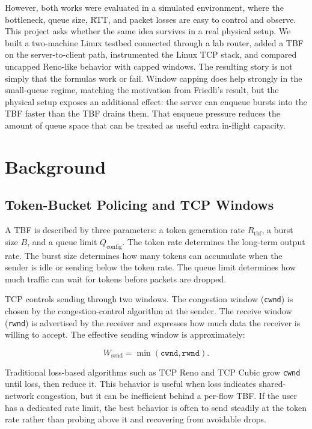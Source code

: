 \documentclass{article}
\newcommand{\code}[1]{\texttt{#1}}
\begin{document}
However, both works were evaluated in a simulated environment, where the bottleneck, queue size, RTT, and packet losses are easy 
to control and observe. This project asks whether the same idea survives in a real physical setup. We built a two-machine 
Linux testbed connected through a lab router, added a TBF on the server-to-client path, instrumented the Linux TCP stack, 
and compared uncapped Reno-like behavior with capped windows. The resulting story is not simply that the formulas work 
or fail. Window capping does help strongly in the small-queue regime, matching the motivation from Friedli's result, but 
the physical setup exposes an additional effect: the server can enqueue bursts into the TBF faster than the TBF drains 
them. That enqueue pressure reduces the amount of queue space that can be treated as useful extra in-flight capacity.

\section{Background}

\subsection{Token-Bucket Policing and TCP Windows}

A TBF is described by three parameters: a token generation rate \(R_{\mathrm{tbf}}\), a burst size \(B\), and a queue limit \(Q_{\mathrm{config}}\). 
The token rate determines the long-term output rate. The burst size determines how many tokens can accumulate when the sender is idle or 
sending below the token rate. The queue limit determines how much traffic can wait for tokens before packets are dropped.

TCP controls sending through two windows. The congestion window (\code{cwnd}) is chosen by the congestion-control algorithm 
at the sender. The receive window (\code{rwnd}) is advertised by the receiver and expresses how much data the receiver is 
willing to accept. The effective sending window is approximately:

\[
W_{\mathrm{send}} = \min(\code{cwnd}, \code{rwnd}).
\]

Traditional loss-based algorithms such as TCP Reno and TCP Cubic grow \code{cwnd} until loss, then reduce it. This behavior is 
useful when loss indicates shared-network congestion, but it can be inefficient behind a per-flow TBF. If the user has a dedicated 
rate limit, the best behavior is often to send steadily at the token rate rather than probing above it and recovering from 
avoidable drops.
\end{document}
